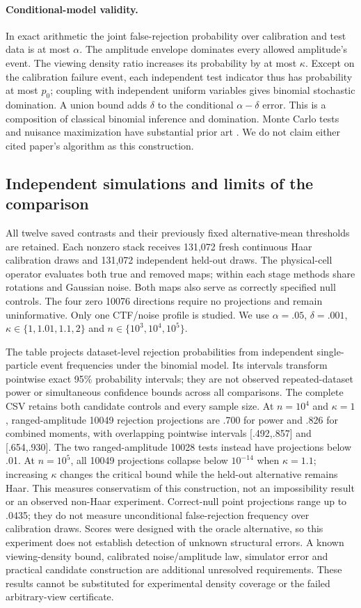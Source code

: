 \paragraph{Conditional-model validity.}
In exact arithmetic the joint false-rejection probability over calibration
and test data is at most $\alpha$. The amplitude envelope dominates every
allowed amplitude's event. The viewing density ratio increases its probability
by at most $\kappa$. Except on the calibration failure event, each independent
test indicator thus has probability at most $p_0$; coupling with independent
uniform variables gives binomial stochastic domination. A union bound adds
$\delta$ to the conditional $\alpha-\delta$ error. This is a composition of
classical binomial inference and domination. Monte Carlo tests and nuisance
maximization have substantial prior art \citep{dufour2006mc,bergerboos1994}.
We do not claim either cited paper's algorithm as this construction.

\subsection{Independent simulations and limits of the comparison}
All twelve saved contrasts and their previously fixed alternative-mean
thresholds are retained. Each nonzero stack receives 131,072 fresh continuous
Haar calibration draws and 131,072 independent held-out draws. The physical-cell
operator evaluates both true and removed maps; within each stage methods share
rotations and Gaussian noise. Both maps also serve as correctly specified
null controls. The four zero 10076 directions require no projections and
remain uninformative. Only one CTF/noise profile is studied. We use
$\alpha=.05$, $\delta=.001$, $\kappa\in\{1,1.01,1.1,2\}$ and
$n\in\{10^3,10^4,10^5\}$.

The table projects dataset-level rejection probabilities from independent
single-particle event frequencies under the binomial model. Its intervals
transform pointwise exact 95\% probability intervals; they are not observed
repeated-dataset power or simultaneous confidence bounds across all comparisons.
The complete CSV retains both candidate controls and every sample size.
At $n=10^4$ and $\kappa=1$, ranged-amplitude 10049 rejection projections
are .700 for power and .826 for combined moments, with overlapping pointwise
intervals [.492,.857] and [.654,.930]. The two ranged-amplitude 10028 tests
instead have projections below .01. At $n=10^5$, all 10049 projections
collapse below $10^{-14}$ when $\kappa=1.1$; increasing $\kappa$ changes the
critical bound while the held-out alternative remains Haar. This measures
conservatism of this construction, not an impossibility result or an observed
non-Haar experiment. Correct-null point projections range up to .0435; they
do not measure unconditional false-rejection frequency over calibration draws.
Scores were designed with the oracle alternative, so this experiment does not
establish detection of unknown structural errors. A known viewing-density
bound, calibrated noise/amplitude law, simulator error and practical candidate
construction are additional unresolved requirements. These results cannot be
substituted for experimental density coverage or the failed arbitrary-view
certificate.


